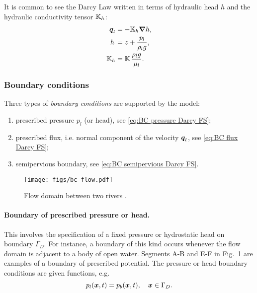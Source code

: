 It is common to see the Darcy Law written in terms of hydraulic head $h$
and the hydraulic conductivity tensor ${\mathbb K}_h$:
\begin{subequations}  \label{eq:HydraulicHead}
\begin{align}
  {\boldsymbol{q}}_l &= -{\mathbb K}_h {\boldsymbol{\nabla}} h,
  \\
  h \, &=  z + \frac{p_l}{\rho_l g},
  \\
  {\mathbb K}_h &= {\mathbb K} \, \frac{\rho_l g}{\mu_l}.
\end{align}
\end{subequations}

\subsubsection{Boundary conditions}


Three types of \textit{boundary conditions} are supported by the model:
\begin{enumerate}
\item
  prescribed pressure $p_l$ (or head), see \eqref{eq:BC pressure Darcy FS};
\item
  prescribed flux, i.e. normal component of the velocity ${\boldsymbol{q}}_l$, see \eqref{eq:BC flux Darcy FS};
\item
  semipervious boundary, see \eqref{eq:BC semipervious Darcy FS}. 
\end{enumerate}

\begin{figure}  [h]
\begin{center} 
\texttt{[image: figs/bc\_flow.pdf]}
\caption{Flow domain between two rivers \citep[it was partially based on]{bear-1972}.}
\label{fig:bc_flow}
\end{center}
\end{figure}

\paragraph{Boundary of prescribed pressure or head.}
This involves the specification of a fixed pressure or hydrostatic head on boundary $\Gamma_D$.
For instance, a boundary of this kind occurs whenever the flow domain is adjacent to a body of open water.
Segments A-B and E-F in Fig.~\ref{fig:bc_flow} are examples of a boundary of prescribed potential.
The pressure or head boundary conditions are given functions, e.g.
\begin{equation}
\label{eq:BC pressure Darcy FS}
  p_l({\boldsymbol{x}},t) = p_{b}({\boldsymbol{x}},t), \quad {\boldsymbol{x}} \in \Gamma_D. 
\end{equation}

